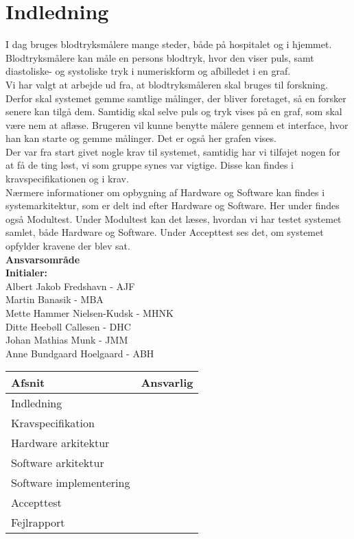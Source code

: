 \chapter{Indledning}
I  dag bruges blodtryksmålere mange steder, både på hospitalet og i hjemmet. Blodtryksmålere kan måle en persons blodtryk, hvor den viser puls, samt diastoliske- og systoliske tryk i numeriskform og afbilledet i en graf.\\ 
Vi har valgt at arbejde ud fra, at blodtryksmåleren skal bruges til forskning. Derfor skal systemet gemme samtlige målinger, der bliver foretaget, så en forsker senere kan tilgå dem. Samtidig skal selve puls og tryk vises på en graf, som skal være nem at aflæse. Brugeren vil kunne benytte målere gennem et interface, hvor han kan starte og gemme målinger. Det er også her grafen vises. \\
Der var fra start givet nogle krav til systemet, samtidig har vi tilføjet nogen for at få de ting løst, vi som gruppe synes var vigtige. Disse kan findes i kravspecifikationen og i krav.\\
Nærmere informationer om opbygning af Hardware og Software kan findes i systemarkitektur, som er delt ind efter Hardware og Software. Her under findes også Modultest. 
Under Modultest kan det læses, hvordan vi har testet systemet samlet, både Hardware og Software. Under Accepttest ses det, om systemet opfylder kravene der blev sat.\\ 


\textbf{Ansvarsområde} \\
\textbf{Initialer: } \\
Albert Jakob Fredshavn - AJF \\
Martin Banasik - MBA \\
Mette Hammer Nielsen-Kudsk - MHNK \\
Ditte Heebøll Callesen - DHC \\
Johan Mathias Munk - JMM \\
Anne Bundgaard Hoelgaard - ABH \\


\begin{longtabu} to 
    Afsnit &    Ansvarlig\\[-1ex]
    \midrule
    Indledning & \\
    Kravspecifikation & \\
    Hardware arkitektur & \\
    Software arkitektur & \\
    Software implementering & \\
    Accepttest & \\
    Fejlrapport & \\
    
    
    

\end{longtabu}